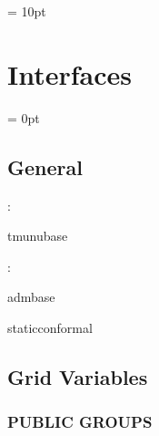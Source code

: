 \documentclass{article}
\begin{document}
\vspace{0.5cm}\parskip = 10pt 

\section{Interfaces} 


\parskip = 0pt

\vspace{3mm} \subsection*{General}

: 

tmunubase
\vspace{2mm}

: 

admbase

staticconformal
\vspace{2mm}
\subsection*{Grid Variables}
\vspace{5mm}\subsubsection{PUBLIC GROUPS}

\vspace{5mm}
\end{document}
